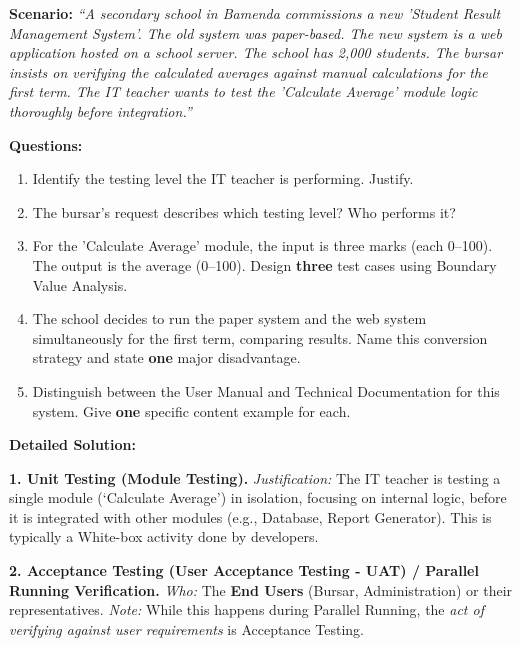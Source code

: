 \documentclass[11pt]{article}
\begin{document}
\begin{exoresolu}
\textbf{Scenario:} \emph{``A secondary school in Bamenda commissions a new 'Student Result Management System'. The old system was paper-based. The new system is a web application hosted on a school server. The school has 2,000 students. The bursar insists on verifying the calculated averages against manual calculations for the first term. The IT teacher wants to test the 'Calculate Average' module logic thoroughly before integration.''}

\textbf{Questions:}
\begin{enumerate}
    \item Identify the testing level the IT teacher is performing. Justify.
    \item The bursar's request describes which testing level? Who performs it?
    \item For the 'Calculate Average' module, the input is three marks (each 0--100). The output is the average (0--100). Design \textbf{three} test cases using Boundary Value Analysis.
    \item The school decides to run the paper system and the web system simultaneously for the first term, comparing results. Name this conversion strategy and state \textbf{one} major disadvantage.
    \item Distinguish between the User Manual and Technical Documentation for this system. Give \textbf{one} specific content example for each.
\end{enumerate}

\tcblower
\textbf{Detailed Solution:}

\textbf{1. Unit Testing (Module Testing).}
\textit{Justification:} The IT teacher is testing a single module (`Calculate Average') in isolation, focusing on internal logic, before it is integrated with other modules (e.g., Database, Report Generator). This is typically a White-box activity done by developers.

\textbf{2. Acceptance Testing (User Acceptance Testing - UAT) / Parallel Running Verification.}
\textit{Who:} The \textbf{End Users} (Bursar, Administration) or their representatives. \textit{Note:} While this happens during Parallel Running, the \emph{act of verifying against user requirements} is Acceptance Testing.


\end{exoresolu}
\end{document}
